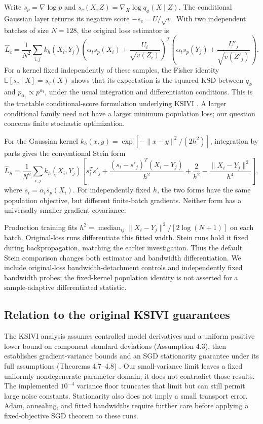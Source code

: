 \documentclass[11pt,a4paper]{article}
\newcommand{\E}{\mathbb E}
\begin{document}
Write $s_p=\nabla\log p$ and $s_c(X,Z)=\nabla_X\log q_\phi(X\mid Z)$.
The conditional Gaussian layer returns its negative score
$-s_c=U/\sqrt v$. With two independent batches of size $N=128$, the original
loss estimator is
\begin{equation}
 \widehat L_c=\frac1{N^2}\sum_{i,j} k_h(X_i,Y_j)
 \left(\alpha_t s_p(X_i)+\frac{U_i}{\sqrt{v(Z_i)}}\right)^T
 \left(\alpha_t s_p(Y_j)+\frac{U'_j}{\sqrt{v(Z'_j)}}\right).
 \label{eq:original}
\end{equation}
For a kernel fixed independently of these samples, the Fisher identity
$\E[s_c\mid X]=s_q(X)$ shows that its expectation is the squared KSD between
$q_\phi$ and $p_{\alpha_t}\propto p^{\alpha_t}$, under the usual integration
and differentiation conditions. This is the tractable conditional-score
formulation underlying KSIVI \cite{ksivi}. A larger conditional family need
not have a larger minimum population loss; our question concerns finite
stochastic optimization.

For the Gaussian kernel $k_h(x,y)=\exp[-\|x-y\|^2/(2h^2)]$, integration by
parts gives the conventional Stein form
\begin{equation}
 \widehat L_S=\frac1{N^2}\sum_{i,j} k_h(X_i,Y_j)
 \left[s_i^Ts'_j+\frac{(s_i-s'_j)^T(X_i-Y_j)}{h^2}
 +\frac2{h^2}-\frac{\|X_i-Y_j\|^2}{h^4}\right],
 \label{eq:stein}
\end{equation}
where $s_i=\alpha_t s_p(X_i)$. For independently fixed $h$, the two forms
have the same population objective, but different finite-batch gradients.
Neither form has a universally smaller gradient covariance.

Production training fits
$h^2=\operatorname{median}_{ij}\|X_i-Y_j\|^2/[2\log(N+1)]$ on each batch.
Original-loss runs differentiate this fitted width. Stein runs hold it fixed
during backpropagation, matching the earlier investigation. Thus the default
Stein comparison changes both estimator and bandwidth differentiation. We
include original-loss bandwidth-detachment controls and independently fixed
bandwidth probes; the fixed-kernel population identity is not asserted for a
sample-adaptive differentiated statistic.

\subsection{Relation to the original KSIVI guarantees}
The KSIVI analysis assumes controlled model derivatives and a uniform positive
lower bound on component standard deviations (Assumption 4.3), then establishes
gradient-variance bounds and an SGD stationarity guarantee under its full
assumptions (Theorems 4.7--4.8) \cite{ksivi}. Our small-variance limit leaves a
fixed uniformly nondegenerate parameter domain; it does not contradict those
results. The implemented $10^{-4}$ variance floor truncates that limit but can
still permit large noise constants. Stationarity also does not imply a small
transport error. Adam, annealing, and fitted bandwidths require further care
before applying a fixed-objective SGD theorem to these runs.
\end{document}
